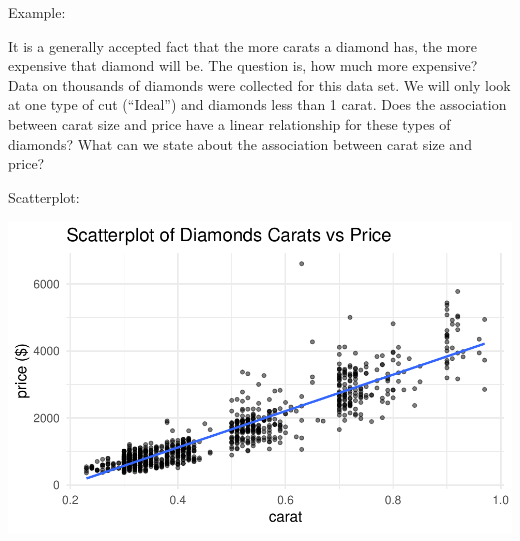 \documentclass[
]{report}
\newenvironment{Shaded}{\begin{snugshade}}{\end{snugshade}}
\newcommand{\AttributeTok}[1]{\textcolor[rgb]{0.77,0.63,0.00}{#1}}
\newcommand{\CommentTok}[1]{\textcolor[rgb]{0.56,0.35,0.01}{\textit{#1}}}
\newcommand{\ConstantTok}[1]{\textcolor[rgb]{0.00,0.00,0.00}{#1}}
\newcommand{\FunctionTok}[1]{\textcolor[rgb]{0.00,0.00,0.00}{#1}}
\newcommand{\NormalTok}[1]{#1}
\newcommand{\SpecialCharTok}[1]{\textcolor[rgb]{0.00,0.00,0.00}{#1}}
\newcommand{\StringTok}[1]{\textcolor[rgb]{0.31,0.60,0.02}{#1}}
\begin{document}

Example:

It is a generally accepted fact that the more carats a diamond has, the more expensive that diamond will be. The question is, how much more expensive? Data on thousands of diamonds were collected for this data set. We will only look at one type of cut (``Ideal'') and diamonds less than 1 carat. Does the association between carat size and price have a linear relationship for these types of diamonds? What can we state about the association between carat size and price?

Scatterplot:

\begin{Shaded}
\end{Shaded}

\begin{center}\includegraphics[width=0.7\linewidth]{13-LN013-regression_files/figure-latex/unnamed-chunk-8-1} \end{center}
\newpage
\end{document}
